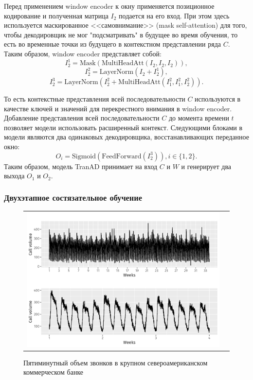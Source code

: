 \documentclass{article}
\begin{document}
Перед применением window encoder к окну применяется позиционное кодирование и полученная матрица $I_2$ подается на его вход. При этом здесь используется маскированное <<самовнимание>> (mask self-attention) для того, чтобы декодировщик не мог "подсматривать" \; в будущее во время обучения, то есть во временные точки из будущего в контекстном представлении ряда $C$. Таким образом, window encoder представляет собой: 
$$
I^1_2 = \text{Mask}(\text{MultiHeadAtt}(I_2, I_2, I_2)),
$$
$$
I^2_2 = \text{LayerNorm}(I_2 + I^1_2),
$$
$$
I^3_2 = \text{LayerNorm}(I^2_2 + \text{MultiHeadAtt}(I^2_1, I^2_1, I^2_2)).
$$

То есть контекстные представления всей последовательности $C$ используются в качестве ключей и значений для перекрестного внимания в window encoder. Добавление представления всей последовательности $C$ до момента времени $t$ позволяет модели использовать расширенный контекст. Следующими блоками в модели являются два одинаковых декодировщика, восстанавливающих переданное окно: 
$$
O_i = \text{Sigmoid}(\text{FeedForward}(I^3_2)), i \in \{1, 2\}.
$$
Таким образом, модель TranAD принимает на вход $C$ и $W$ и генерирует два выхода $O_1$ и $O_2$.

\subsubsection{Двухэтапное состязательное обучение}

\begin{figure}[h]
\begin{tabular}{cc}
  \includegraphics[width=160mm]{4.png}
\end{tabular}
\caption{Пятиминутный объем звонков в крупном североамериканском коммерческом банке}
\label{fig:calls}
\end{figure}
\end{document}
